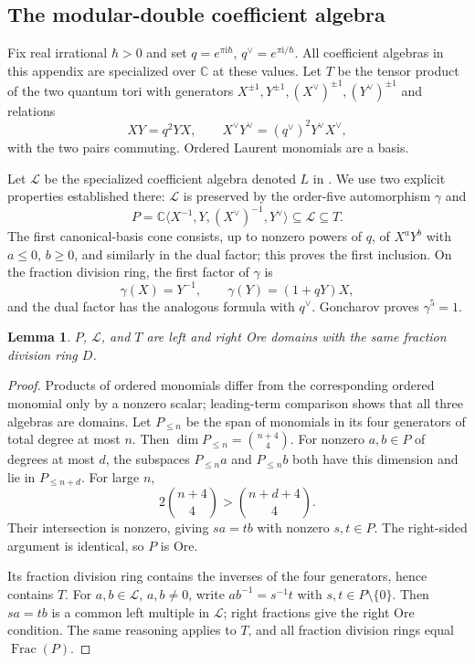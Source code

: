 \documentclass[11pt]{article}
\numberwithin{equation}{section}
\newtheorem{lemma}[lemma]{Lemma}
\theoremstyle{definition}
\theoremstyle{remark}
\newcommand{\C}{\mathbb C}
\newcommand{\ii}{\mathrm i}
\newcommand{\Frac}{\operatorname{Frac}}
\newcommand{\calL}{\mathcal L}
\newcommand{\qh}{\hbar}
\begin{document}
\subsection{The modular-double coefficient algebra}

Fix real irrational $\qh>0$ and set $q=e^{\pi\ii\qh}$,
$q^\vee=e^{\pi\ii/\qh}$. All coefficient algebras in this appendix are
specialized over $\C$ at these values. Let $T$ be the tensor product of the
two quantum tori with generators
$X^{\pm1},Y^{\pm1},(X^\vee)^{\pm1},(Y^\vee)^{\pm1}$ and relations
\begin{equation}\label{eq:qtori}
 XY=q^2YX,\qquad X^\vee Y^\vee=(q^\vee)^2Y^\vee X^\vee,
\end{equation}
with the two pairs commuting. Ordered Laurent monomials are a basis.

Let $\calL$ be the specialized coefficient algebra denoted $L$ in
\cite[Section~2.2]{Goncharov2007}. We use two explicit properties established
there: $\calL$ is preserved by the order-five automorphism $\gamma$ and
\begin{equation}\label{eq:P-in-L}
 P=\C\langle X^{-1},Y,(X^\vee)^{-1},Y^\vee\rangle
 \subseteq\calL\subseteq T.
\end{equation}
The first canonical-basis cone consists, up to nonzero powers of $q$, of
$X^aY^b$ with $a\leq0$, $b\geq0$, and similarly in the dual factor;
this proves the first inclusion. On the fraction division ring, the first
factor of $\gamma$ is
\begin{equation}\label{eq:gamma}
 \gamma(X)=Y^{-1},\qquad \gamma(Y)=(1+qY)X,
\end{equation}
and the dual factor has the analogous formula with $q^\vee$.
Goncharov proves $\gamma^5=1$.

\begin{lemma}\label{lem:OreP}
$P$, $\calL$, and $T$ are left and right Ore domains with the same fraction
division ring $D$.
\end{lemma}
\begin{proof}
Products of ordered monomials differ from the corresponding ordered
monomial only by a nonzero scalar; leading-term comparison shows that all
three algebras are domains. Let $P_{\leq n}$ be the span of monomials in its
four generators of total degree at most $n$. Then
$\dim P_{\leq n}=\binom{n+4}{4}$.
For nonzero $a,b\in P$ of degrees at most $d$, the subspaces
$P_{\leq n}a$ and $P_{\leq n}b$ both have this dimension and lie in
$P_{\leq n+d}$. For large $n$,
\[
 2\binom{n+4}{4}>\binom{n+d+4}{4}.
\]
Their intersection is nonzero, giving $sa=tb$ with nonzero $s,t\in P$.
The right-sided argument is identical, so $P$ is Ore.

Its fraction division ring contains the inverses of the four generators,
hence contains $T$. For $a,b\in\calL$, $a,b\ne0$, write
$ab^{-1}=s^{-1}t$ with $s,t\in P\setminus\{0\}$. Then $sa=tb$ is a common
left multiple in $\calL$; right fractions give the right Ore condition.
The same reasoning applies to $T$, and all fraction division rings equal
$\Frac(P)$.
\end{proof}
\end{document}
